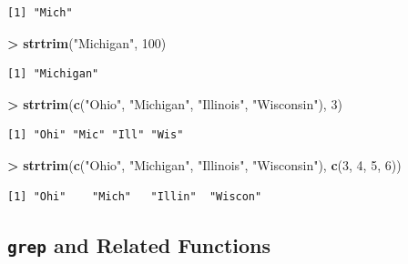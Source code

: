 \documentclass[
]{krantz}
\makeatletter
\newenvironment{Shaded}{\begin{snugshade}}{\end{snugshade}}
\newcommand{\DecValTok}[1]{\textcolor[rgb]{0.06,0.06,0.06}{#1}}
\newcommand{\KeywordTok}[1]{\textcolor[rgb]{0.27,0.27,0.27}{\textbf{#1}}}
\newcommand{\NormalTok}[1]{#1}
\newcommand{\OperatorTok}[1]{\textcolor[rgb]{0.43,0.43,0.43}{\textbf{#1}}}
\newcommand{\StringTok}[1]{\textcolor[rgb]{0.5,0.5,0.5}{#1}}
\newenvironment{kframe}{%
\medskip{}
\setlength{\fboxsep}{.8em}
 \def\at@end@of@kframe{}%
 \ifinner\ifhmode%
  \def\at@end@of@kframe{\end{minipage}}%
  \begin{minipage}{\columnwidth}%
 \fi\fi%
 \def\FrameCommand##1{\hskip\@totalleftmargin \hskip-\fboxsep
 \colorbox{shadecolor}{##1}\hskip-\fboxsep
     \hskip-\linewidth \hskip-\@totalleftmargin \hskip\columnwidth}%
 \MakeFramed {\advance\hsize-\width
   \@totalleftmargin\z@ \linewidth\hsize
   \@setminipage}}%
 {\par\unskip\endMakeFramed%
 \at@end@of@kframe}
\renewenvironment{Shaded}{\begin{kframe}}{\end{kframe}}
\makeatother
\begin{document}
\begin{verbatim}
[1] "Mich"
\end{verbatim}

\begin{Shaded}
\begin{Highlighting}[]
\OperatorTok{\textgreater{}}\StringTok{ }\KeywordTok{strtrim}\NormalTok{(}\StringTok{"Michigan"}\NormalTok{, }\DecValTok{100}\NormalTok{)}
\end{Highlighting}
\end{Shaded}

\begin{verbatim}
[1] "Michigan"
\end{verbatim}

\begin{Shaded}
\begin{Highlighting}[]
\OperatorTok{\textgreater{}}\StringTok{ }\KeywordTok{strtrim}\NormalTok{(}\KeywordTok{c}\NormalTok{(}\StringTok{"Ohio"}\NormalTok{, }\StringTok{"Michigan"}\NormalTok{, }\StringTok{"Illinois"}\NormalTok{, }\StringTok{"Wisconsin"}\NormalTok{), }\DecValTok{3}\NormalTok{)}
\end{Highlighting}
\end{Shaded}

\begin{verbatim}
[1] "Ohi" "Mic" "Ill" "Wis"
\end{verbatim}

\begin{Shaded}
\begin{Highlighting}[]
\OperatorTok{\textgreater{}}\StringTok{ }\KeywordTok{strtrim}\NormalTok{(}\KeywordTok{c}\NormalTok{(}\StringTok{"Ohio"}\NormalTok{, }\StringTok{"Michigan"}\NormalTok{, }\StringTok{"Illinois"}\NormalTok{, }\StringTok{"Wisconsin"}\NormalTok{), }\KeywordTok{c}\NormalTok{(}\DecValTok{3}\NormalTok{, }\DecValTok{4}\NormalTok{, }\DecValTok{5}\NormalTok{, }\DecValTok{6}\NormalTok{))}
\end{Highlighting}
\end{Shaded}

\begin{verbatim}
[1] "Ohi"    "Mich"   "Illin"  "Wiscon"
\end{verbatim}

\hypertarget{grep-and-related-functions}{%
\subsection{\texorpdfstring{\texttt{grep} and Related Functions}{grep and Related Functions}}\label{grep-and-related-functions}}
\end{document}

